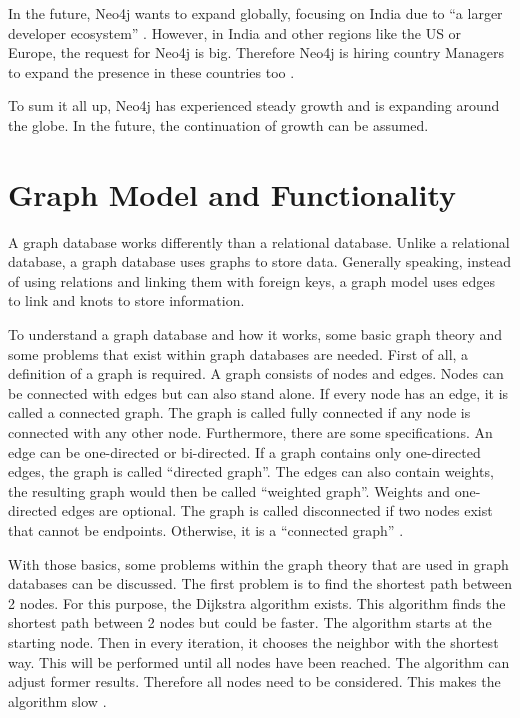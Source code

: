 In the future, Neo4j wants to expand globally, focusing on India due to \enquote{a larger developer ecosystem} \parencite{historyneo4j}. However, in India and other regions like the US or Europe, the request 
for Neo4j is big. Therefore Neo4j is hiring country Managers to expand the presence in these countries too \parencite{historyneo4j}.

To sum it all up, Neo4j has experienced steady growth and is expanding around the globe. In the future, the continuation of growth can be assumed.

\section{Graph Model and Functionality} \label{sec:graphModelFunctionalityNeo4j}

A graph database works differently than a relational database. Unlike a relational database, a graph database uses graphs to store data. Generally speaking, instead of using relations and linking them with foreign keys, a graph model uses edges to link and knots to store information.

To understand a graph database and how it works, some basic graph theory and some problems that exist within graph databases are needed. First of all, a definition of a graph is required. A graph consists of nodes and edges. Nodes can be connected with edges but can also stand alone. If every node has an edge, it is called a connected graph. The graph is called fully connected if any node is connected with any other node.
Furthermore, there are some specifications. An edge can be one-directed or bi-directed. If a graph contains only one-directed edges, the graph is called \enquote{directed graph}. The edges can also contain weights, the resulting graph would then be called \enquote{weighted graph}. Weights and one-directed edges are optional. The graph is called disconnected if two nodes exist that cannot be endpoints. Otherwise, it is a \enquote{connected graph} \parencite{graphBasics}.

With those basics, some problems within the graph theory that are used in graph databases can be discussed. The first problem is to find the shortest path between 2 nodes. For this purpose, the Dijkstra algorithm exists. This algorithm finds the shortest path between 2 nodes but could be faster. The algorithm starts at the starting node. Then in every iteration, it chooses the neighbor with the shortest way. This will be performed until all nodes have been reached.
The algorithm can adjust former results. Therefore all nodes need to be considered. This makes the algorithm slow \parencite{dijkstra}.


